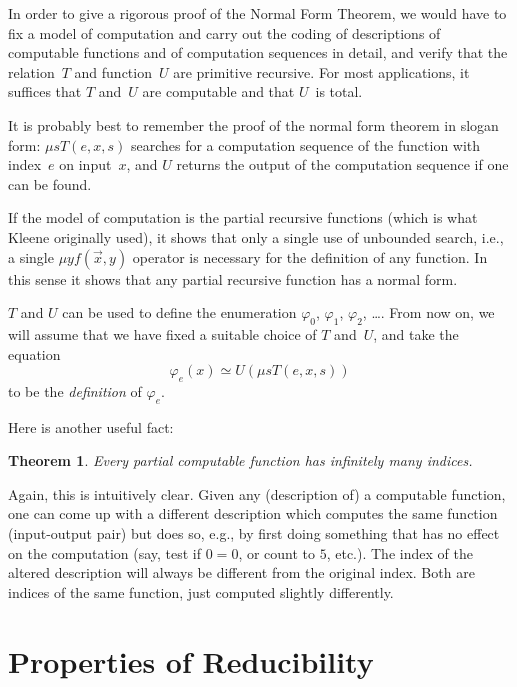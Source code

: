 \documentclass[10pt,a4paper]{article}
\theoremstyle{plain}
\newtheorem{thm}{Theorem}[section]
\theoremstyle{definition}
\theoremstyle{remark}
\newenvironment{explain}{}{}
\newcommand*{\olfileid}[3]{}
\newcommand*{\olsection}[1]{\section*{#1}}
\providecommand{\cfind}[1]{\varphi_{#1}}
\providecommand{\umin}{\mu}
\begin{document}
\begin{explain}
In order to give a rigorous proof of the Normal Form Theorem, we would
have to fix a model of computation and carry out the coding of
descriptions of computable functions and of computation sequences in
detail, and verify that the relation~$T$ and function~$U$ are
primitive recursive.  For most applications, it suffices that $T$
and~$U$ are computable and that $U$~is total.

It is probably best to remember the proof of the normal form theorem
in slogan form: $\umin{s}{T(e, x, s)}$ searches for a computation
sequence of the function with index~$e$ on input~$x$, and $U$ returns
the output of the computation sequence if one can be found.
\end{explain}

If the model of computation is the partial recursive functions (which
is what Kleene originally used), it shows that only a single use of
unbounded search, i.e., a single $\umin{y}{f(\vec x, y)}$ operator is
necessary for the definition of any function. In this sense it shows
that any partial recursive function has a normal form.

$T$ and $U$ can be used to define the enumeration $\cfind{0}$,
$\cfind{1}$, $\cfind{2}$, \dots.  From now on, we will assume that we
have fixed a suitable choice of $T$ and~$U$, and take the equation
\[
\cfind{e}(x) \simeq U(\umin{s}{T(e,x,s)})
\]
to be the \emph{definition} of $\cfind{e}$.

Here is another useful fact:

\begin{thm}
Every partial computable function has infinitely many indices.
\end{thm}

Again, this is intuitively clear.  Given any (description of) a
computable function, one can come up with a different description
which computes the same function (input-output pair) but does so,
e.g., by first doing something that has no effect on the computation
(say, test if $0 = 0$, or count to $5$, etc.).  The index of the
altered description will always be different from the original
index.  Both are indices of the same function, just computed slightly
differently.





\olfileid{cmp}{thy}{ppr}
\olsection{Properties of Reducibility}
\end{document}
